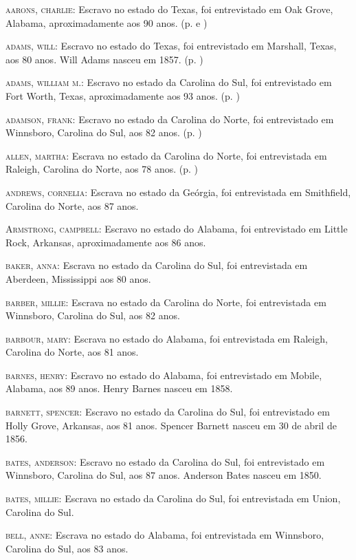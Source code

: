 \begin{Parskip}
\textsc{aarons, charlie:} Escravo no estado do Texas, foi entrevistado
em Oak Grove, Alabama, aproximadamente aos 90 anos. (p. \pageref{ref01} e \pageref{ref02})

\textsc{adams, will:} Escravo no estado do Texas, foi entrevistado em
Marshall, Texas, aos 80 anos. Will Adams nasceu em 1857. (p. \pageref{ref03})

\textsc{adams, william m.:} Escravo no estado da Carolina do Sul, foi
entrevistado em Fort Worth, Texas, aproximadamente aos 93 anos. (p. \pageref{ref04})

\textsc{adamson, frank:} Escravo no estado da Carolina do Norte, foi
entrevistado em Winnsboro, Carolina do Sul, aos 82 anos. (p. \pageref{ref05})

\textsc{allen, martha:} Escrava no estado da Carolina do Norte, foi
entrevistada em Raleigh, Carolina do Norte, aos 78 anos. (p. \pageref{ref06})

\textsc{andrews, cornelia:} Escrava no estado da Geórgia, foi
entrevistada em Smithfield, Carolina do Norte, aos 87 anos.

\textsc{Armstrong, campbell:} Escravo no estado do Alabama, foi
entrevistado em Little Rock, Arkansas, aproximadamente aos 86 anos.

\textsc{baker, anna:} Escrava no estado da Carolina do Sul, foi
entrevistada em Aberdeen, Mississippi aos 80 anos.

\textsc{barber, millie:} Escrava no estado da Carolina do Norte, foi
entrevistada em Winnsboro, Carolina do Sul, aos 82 anos.

\textsc{barbour, mary:} Escrava no estado do Alabama, foi entrevistada
em Raleigh, Carolina do Norte, aos 81 anos.

\textsc{barnes, henry:} Escravo no estado do Alabama, foi entrevistado
em Mobile, Alabama, aos 89 anos. Henry Barnes nasceu em 1858.

\textsc{barnett, spencer:} Escravo no estado da Carolina do Sul, foi
entrevistado em Holly Grove, Arkansas, aos 81 anos. Spencer Barnett
nasceu em 30 de abril de 1856.

\textsc{bates, anderson:} Escravo no estado da Carolina do Sul, foi
entrevistado em Winnsboro, Carolina do Sul, aos 87 anos. Anderson Bates
nasceu em 1850.

\textsc{bates, millie:} Escrava no estado da Carolina do Sul, foi
entrevistada em Union, Carolina do Sul.

\textsc{bell, anne:} Escrava no estado do Alabama, foi entrevistada em
Winnsboro, Carolina do Sul, aos 83 anos.


\end{Parskip}
